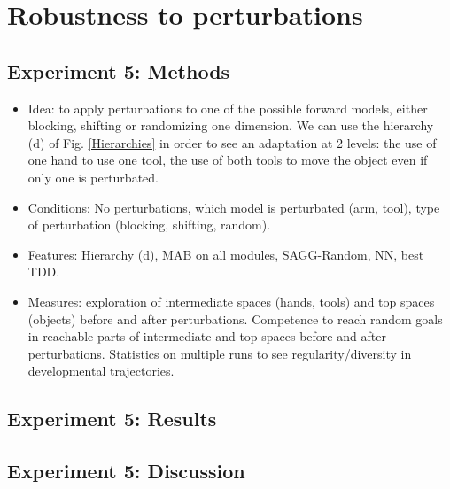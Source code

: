 \documentclass[conference]{include/IEEEtran}
\begin{document}
	

%
	
\section{Robustness to perturbations}

	
	\subsection{Experiment 5: Methods}	
		
		\begin{itemize}
			\item Idea: to apply perturbations to one of the possible forward models, either blocking, shifting or randomizing one dimension. 
					We can use the hierarchy (d) of Fig. \ref{Hierarchies} in order to see an adaptation at 2 levels: the use of one hand to use one tool, the use of both tools to move the object even if only one is perturbated.
			
			\item Conditions: No perturbations, which model is perturbated (arm, tool), type of perturbation (blocking, shifting, random).
			
			\item Features: Hierarchy (d), MAB on all modules, SAGG-Random, NN, best TDD.
			
			\item Measures: exploration of intermediate spaces (hands, tools) and top spaces (objects) before and after perturbations. 
					Competence to reach random goals in reachable parts of intermediate and top spaces before and after perturbations. 
					Statistics on multiple runs to see regularity/diversity in developmental trajectories.
		\end{itemize}
		

	\subsection{Experiment 5: Results}
	
		
	
	\subsection{Experiment 5: Discussion}	
	
\end{document}
